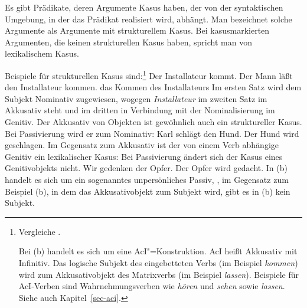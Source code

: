 Es gibt Prädikate, deren Argumente Kasus haben, der von der syntaktischen Umgebung,
in der das Prädikat realisiert wird, abhängt. Man bezeichnet solche Argumente
als Argumente mit strukturellem Kasus. Bei kasusmarkierten Argumenten,
die keinen strukturellen Kasus haben, spricht man von lexikalischem Kasus.

Beispiele für strukturellen Kasus sind:\footnote{
        Vergleiche .

        Bei (b) handelt es sich um eine AcI"=Konstruktion. AcI heißt Akkusativ mit
        Infinitiv. Das logische Subjekt des eingebetteten Verbs (im Beispiel \emph{kommen})
        wird zum Akkusativobjekt des Matrixverbs (im Beispiel \emph{lassen}).
        Beispiele für AcI-Verben sind Wahrnehmungsverben wie \emph{hören} und 
        \emph{sehen} sowie \emph{lassen}. Siehe auch Kapitel~\ref{sec-aci}.
}
\eal
\ex Der Installateur kommt.
\ex Der Mann läßt den Installateur kommen.
\ex das Kommen des Installateurs
\zl
Im ersten Satz wird dem Subjekt Nominativ zugewiesen, wogegen \emph{Installateur} im
zweiten Satz im Akkusativ steht und im dritten in Verbindung mit der Nominalisierung
im Genitiv. Der Akkusativ von Objekten ist gewöhnlich auch ein struktureller Kasus. 
Bei Passivierung wird er zum Nominativ:
\eal
\ex Karl schlägt den Hund.
\ex Der Hund wird geschlagen.
\zl
Im Gegensatz zum Akkusativ ist der von einem Verb abhängige Genitiv ein lexikalischer Kasus:
Bei Passivierung ändert sich der Kasus eines Genitivobjekts nicht.
\eal
\ex Wir gedenken der Opfer.
\ex Der Opfer wird gedacht.
\zl
In (b) handelt es sich um ein sogenanntes unpersönliches Passiv,
\dash, im Gegensatz zum Beispiel (b), in dem das Akkusativobjekt zum Subjekt wird, 
gibt es in (b) kein Subjekt.

